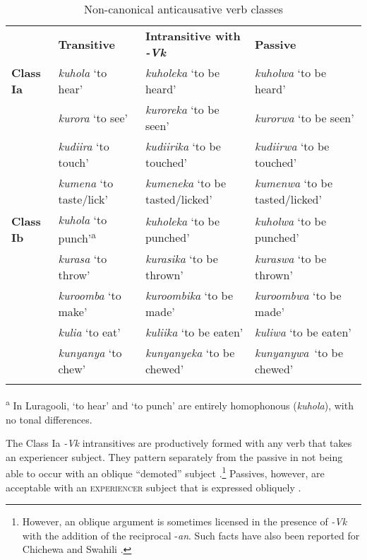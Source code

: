 \documentclass[output=paper]{langsci/langscibook}
\begin{document}
\begin{table}
\caption{Non-canonical anticausative verb classes}
\label{tab:4}

\begin{tabularx}{\textwidth}{XXXX} & \textbf{Transitive} & \textbf{Intransitive with }\textbf{\textit{-Vk}} & \textbf{Passive}\\
\lsptoprule
\textbf{Class Ia} & \textit{kuhola} ‘to hear’ & \textit{kuholeka }‘to be heard’ & \textit{kuholwa} ‘to be heard’\\
& \textit{kurora} ‘to see’ & \textit{kuroreka} ‘to be seen’ & \textit{kurorwa} ‘to be seen’\\
\hhline{~---} & \textit{kudiira} ‘to touch’ & \textit{kudiirika} ‘to be touched’ & \textit{kudiirwa} ‘to be touched’\\
\hhline{~---} & \textit{kumena} ‘to taste/lick’ & \textit{kumeneka} ‘to be tasted/licked’ & \textit{kumenwa} ‘to be tasted/licked’\\
\textbf{Class Ib} & \textit{kuhola} ‘to punch’\textsuperscript{a} & \textit{kuholeka} ‘to be punched’ & \textit{kuholwa} ‘to be punched’\\
& \textit{kurasa} ‘to throw’ & \textit{kurasika} ‘to be thrown’ & \textit{kuraswa} ‘to be thrown’\\
\hhline{~---} & \textit{kuroomba} ‘to make’ & \textit{kuroombika} ‘to be made’ & \textit{kuroombwa} ‘to be made’\\
\hhline{~---} & \textit{kulia} ‘to eat’ & \textit{kuliika} ‘to be eaten’ & \textit{kuliwa} ‘to be eaten’\\
\hhline{~---} & \textit{kunyanya} ‘to chew’ & \textit{kunyanyeka} ‘to be chewed’ & \textit{kunyanywa}~‘to be chewed’\\
\hhline{~---}
\lspbottomrule
\end{tabularx}
\textsuperscript{a }In Luragooli, ‘to hear’ and ‘to punch’\textit{ }are entirely homophonous (\textit{kuhola}), with no tonal differences.

\end{table}

The Class Ia \textit{-Vk }intransitives are productively formed with any verb that takes an experiencer subject. They pattern separately from the passive in not being able to occur with an oblique “demoted” subject .\footnote{ However, an oblique argument is sometimes licensed in the presence of \textit{-Vk} with the addition of the reciprocal -\textit{an}. Such facts have also been reported for Chichewa and Swahili \citep{DubinskySimango1996,SeidlDimitriadis2003}.} Passives, however, are acceptable with an \textsc{experiencer} subject that is expressed obliquely .
\end{document}
